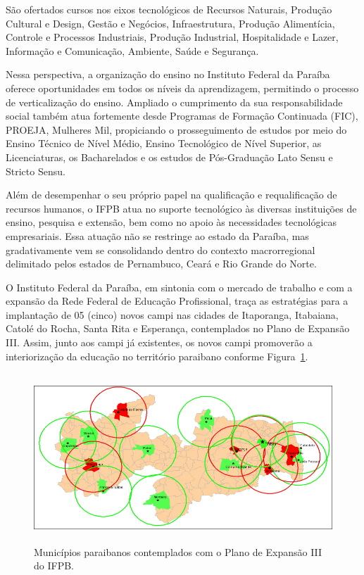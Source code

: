 São ofertados cursos nos eixos tecnológicos de Recursos Naturais, Produção Cultural e Design, Gestão e Negócios, Infraestrutura, Produção Alimentícia, Controle e Processos Industriais, Produção Industrial, Hospitalidade e Lazer, Informação e Comunicação, Ambiente, Saúde e Segurança.

Nessa perspectiva, a organização do ensino no Instituto Federal da Paraíba oferece oportunidades em todos os níveis da aprendizagem, permitindo o processo de verticalização do ensino. Ampliado o cumprimento da sua responsabilidade social também atua fortemente desde Programas de Formação Continuada (FIC), PROEJA, Mulheres Mil, propiciando o prosseguimento de estudos por meio do Ensino Técnico de Nível Médio, Ensino Tecnológico de Nível Superior, as Licenciaturas, os Bacharelados e os estudos de Pós-Graduação Lato Sensu e Stricto Sensu.

Além de desempenhar o seu próprio papel na qualificação e requalificação de recursos humanos, o IFPB atua no suporte tecnológico às diversas instituições de ensino, pesquisa e extensão, bem como no apoio às necessidades tecnológicas empresariais. Essa atuação não se restringe ao estado da Paraíba, mas gradativamente vem se consolidando dentro do contexto macrorregional delimitado pelos estados de Pernambuco, Ceará e Rio Grande do Norte.

O Instituto Federal da Paraíba, em sintonia com o mercado de trabalho e com a expansão da Rede Federal de Educação Profissional, traça as estratégias para a implantação de 05 (cinco) novos campi nas cidades de Itaporanga, Itabaiana, Catolé do Rocha, Santa Rita e Esperança, contemplados no Plano de Expansão III. Assim, junto aos campi já existentes, os novos campi promoverão a interiorização da educação no território paraibano conforme Figura~\ref{fig:IFPB2}.


\begin{figure}
  \centering
  \includegraphics[height=2.5in]{imagens/campiIFPB2.png}
  \caption {Municípios paraibanos contemplados com o Plano de Expansão III do IFPB.}
  \label{fig:IFPB2}
\end{figure}

